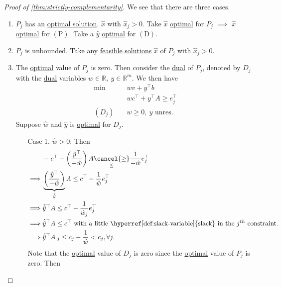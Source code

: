 \begin{proof}[Proof of \autoref{thm:strictly-complementarity}]
	We see that there are three cases.
	\begin{enumerate}
		\item \(P_{j}\) has an \hyperref[def:optimal-solution]{optimal solution}. \(\hat{x}\) with \(\hat{x}_j>0\). Take \(\hat{x}\) \hyperref[def:optimal-solution]{optimal} for \(P_{j}\) \(\implies\) \(\hat{x}\) \hyperref[def:optimal-solution]{optimal} for \((\mathrm{P})\). Take a \(\hat{y}\) \hyperref[def:optimal-solution]{optimal} for \((\mathrm{D})\).
		\item \(P_{j}\) is unbounded. Take any \hyperref[def:feasible-solution]{feasible solutions} \(\hat{x}\) of \(P_{j}\) with \(\hat{x}_j>0\).
		\item The \hyperref[def:optimal-solution]{optimal} value of \(P_{j}\) is zero. Then consider the \hyperref[def:dual]{dual} of \(P_{j}\), denoted by \(D_{j}\) with the \hyperref[def:dual]{dual} variables \(w\in\mathbb{R},\ y\in\mathbb{R}^m\). We then have
		      \[
			      \begin{aligned}
				      \min~        & wv + y^{\top}b                        \\
				                   & wc^{\top}+y^{\top}A \geq e_{j}^{\top} \\
				      (D_{j})\quad & w\geq 0,\ y \text{ unres.}
			      \end{aligned}
		      \]
		      Suppose \(\hat{w}\) and \(\hat{y}\) is \hyperref[def:optimal-solution]{optimal} for \(D_{j}\).
		      \begin{enumerate}
			      \item[Case 1.] \(\hat{w}>0\): Then
				      \[
					      \begin{split}
						      &-c^{\top} + \left( \frac{\hat{y}^{\top}}{-\hat{w}} \right)A\underset{\leq }{\cancel{\geq}} \frac{1}{-\hat{w}} e_{j}^{\top}\\
						      \implies&\underbrace{\left( \frac{\hat{y}^{\top}}{-\hat{w}} \right)}_{\hat{\hat{y}}} A\leq c^{\top} -  \frac{1}{\hat{w}} e_{j}^{\top}\\
						      \implies&\hat{\hat{y}}^{\top}A\leq c^{\top} - \frac{1}{\hat{w}_j}e_{j}^{\top}\\
						      \implies&\hat{\hat{y}}^{\top}A\leq c^{\top} \text{ with a little \hyperref[def:slack-variable]{slack} in the \(j^{th}\) constraint.}\\
						      \implies&\hat{\hat{y}}^{\top}A_{\cdot j}\leq c_{j} - \frac{1}{\hat{w}}<c_{j}, \forall j.
					      \end{split}
				      \]
				      Note that the \hyperref[def:optimal-solution]{optimal} value of \(D_{j}\) is zero since the \hyperref[def:optimal-solution]{optimal} value of \(P_{j}\) is zero. Then

\end{enumerate}
\end{enumerate}
\end{proof}
